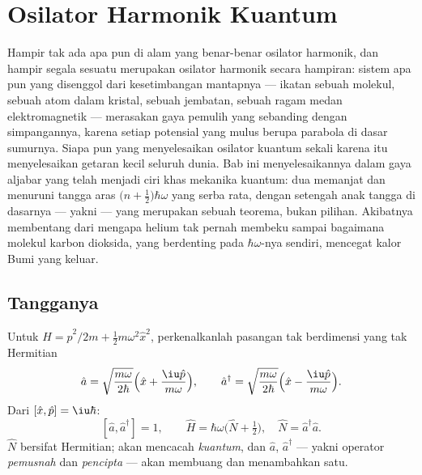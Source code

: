 \chapter{Osilator Harmonik Kuantum}\label{ch:b3:harmonic-oscillator}

Hampir tak ada apa pun di alam yang benar-benar osilator harmonik, dan
hampir segala sesuatu merupakan osilator harmonik secara hampiran:
sistem apa pun yang disenggol dari kesetimbangan mantapnya --- ikatan
sebuah molekul, sebuah atom dalam kristal, sebuah jembatan, sebuah ragam
medan elektromagnetik --- merasakan gaya pemulih yang sebanding dengan
simpangannya, karena setiap potensial yang mulus berupa parabola di
dasar sumurnya. Siapa pun yang menyelesaikan osilator kuantum sekali
karena itu menyelesaikan getaran kecil seluruh dunia. Bab ini
menyelesaikannya dalam gaya aljabar yang telah menjadi ciri khas
mekanika kuantum: dua  memanjat dan menuruni tangga aras
$\big(n +
\tfrac12\big)\hbar\omega$ yang serba rata, dengan setengah anak tangga
di dasarnya --- yakni  --- yang merupakan sebuah teorema,
bukan pilihan. Akibatnya membentang dari mengapa helium tak pernah
membeku sampai bagaimana molekul karbon dioksida, yang berdenting pada
$\hbar\omega$-nya sendiri, mencegat kalor Bumi yang keluar.

\section{Tangganya}

\begin{definition}\label{def:b3:harmonic-oscillator:ladder}
Untuk $\hat H = \hat p^2/2m + \tfrac12 m\omega^2\hat x^2$,
perkenalkanlah pasangan tak berdimensi yang tak Hermitian
\[
\hat a = \sqrt{\frac{m\omega}{2\hbar}}\Big(\hat x +
\frac{\iu\hat p}{m\omega}\Big) , \qquad
\hat a^\dagger = \sqrt{\frac{m\omega}{2\hbar}}\Big(\hat x -
\frac{\iu\hat p}{m\omega}\Big) .
\]
Dari $[\hat x, \hat p] = \iu\hbar$:
\[
[\hat a, \hat a^\dagger] = 1 , \qquad
\hat H = \hbar\omega\Big(\hat N + \tfrac12\Big) , \quad
\hat N = \hat a^\dagger\hat a .
\]
$\hat N$ bersifat Hermitian;  akan mencacah \emph{kuantum},
dan $\hat a$, $\hat a^\dagger$ --- yakni operator \emph{pemusnah} dan
\emph{pencipta} --- akan membuang dan menambahkan satu.
\end{definition}

